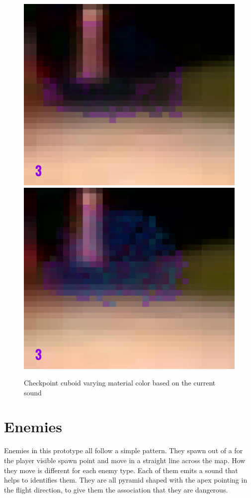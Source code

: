 \begin{figure}[p]
  \centering
  \includegraphics[width=\imgWidth]{images/game_systems/GoalDim.png} \\[\picVdist]
  \includegraphics[width=\imgWidth]{images/game_systems/GoalBright.png}
  \caption{Checkpoint cuboid varying material color based on the current sound}
  \label{GoalBlinks}
\end{figure}


\section{Enemies}
Enemies in this prototype all follow a simple pattern. They spawn out of a for the player visible spawn point and move in a straight line across the map. How they move is different for each enemy type. Each of them emits a sound that helps to identifies them. They are all pyramid shaped with the apex pointing in the flight direction, to give them the association that they are dangerous.


